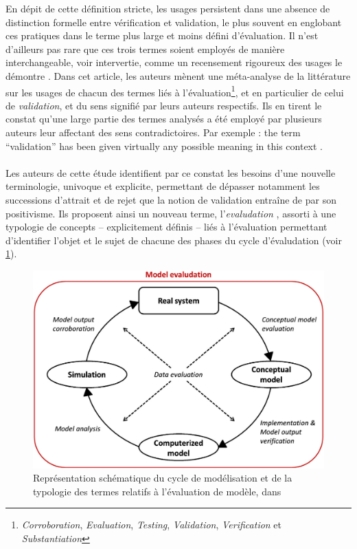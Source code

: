 En dépit de cette définition stricte, les usages persistent dans une absence de distinction formelle entre vérification et validation, le plus souvent en englobant ces pratiques dans le terme plus large et moins défini d'\og évaluation\fg{}.
Il n'est d'ailleurs pas rare que ces trois termes soient employés de manière interchangeable, voir intervertie, comme un recensement rigoureux des usages le démontre \autocite{augusiak_merging_2014}.
Dans cet article, les auteurs mènent une méta-analyse de la littérature sur les usages de chacun des termes liés à l'évaluation\footnote{
	\textit{Corroboration}, \textit{Evaluation}, \textit{Testing}, \textit{Validation}, \textit{Verification} et \textit{Substantiation}
}, et en particulier de celui de \textit{validation}, et du sens signifié par leurs auteurs respectifs.
Ils en tirent le constat qu'une large partie des termes analysés a été employé par plusieurs auteurs leur affectant des sens contradictoires.
Par exemple : \og the term ``validation'' has been given virtually any possible meaning in this context\fg{} \autocite[120]{augusiak_merging_2014}.

\paragraph*{}
Les auteurs de cette étude identifient par ce constat les besoins d'une nouvelle terminologie, univoque et explicite, permettant de dépasser notamment les successions d'attrait et de rejet que la notion de validation entraîne de par son positivisme.
Ils proposent ainsi un nouveau terme, l'\og \textit{evaludation} \fg{}, assorti à une typologie de concepts -- explicitement définis \autocite[table 2, p. 125]{augusiak_merging_2014} -- liés à l'évaluation permettant d'identifier l'objet et le sujet de chacune des phases du cycle d'\og évaludation\fg{} (voir \cref{fig:schema_evaludationl}).

\begin{figure}[H]
	\includegraphics[width=\linewidth]{img/Schema_Augusiak_evaludation.png}
	\caption[Représentation schématique du cycle de modélisation et de la typologie des termes relatifs à l'évaluation de modèle.]{Représentation schématique du cycle de modélisation et de la typologie des termes relatifs à l'évaluation de modèle, dans \textcite[Fig. 1, p. 121]{augusiak_merging_2014}}
	\label{fig:schema_evaludationl}
\end{figure}

